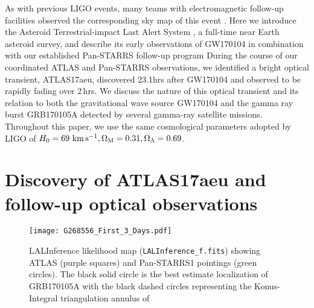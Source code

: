 \documentclass[twocolumn]{aastex61}
\newcommand{\kms}{\mbox{$\rm{\,km\,s^{-1}}$}}
\begin{document}
As with previous LIGO events, many teams with electromagnetic follow-up facilities observed the corresponding sky map of this event 
\citep[e.g. for a summary of the GW150914 effort see][]{2016ApJ...826L..13A}. 
Here we introduce the Asteroid Terrestrial-impact Last Alert System \citep[ATLAS;][]{2011PASP..123...58T}, a full-time near Earth asteroid survey,  
and describe its early observations of GW170104 in combination with 
our established Pan-STARRS follow-up program  \citep{2016arXiv161205560C,2016MNRAS.462.4094S,2016ApJ...827L..40S}
During the course of our coordinated ATLAS and Pan-STARRS observations, we identified a bright optical transient, ATLAS17aeu, discovered 23.1hrs after GW170104 and observed to be 
rapidly fading over 2\,hrs.  We discuss the nature of this optical transient and its relation to both the gravitational wave source
GW170104 and the gamma ray burst GRB170105A detected by several gamma-ray satellite missions. 
Throughout this paper, we use the same cosmological parameters adopted by LIGO of  
$H_0 = 69\,\kms,\Omega_{\rm M} = 0.31,\Omega_\Lambda =  0.69$. 

\section{Discovery of ATLAS17aeu and follow-up optical observations}
\label{sec:obs}

\begin{figure}
\texttt{[image: G268556\_First\_3\_Days.pdf]}
\caption{
{LALInference likelihood map (\texttt{LALInference\_f.fits})
showing ATLAS (purple squares) and Pan-STARRS1 pointings (green circles). The black solid circle is the best estimate localization of GRB170105A with the black dashed circles representing the Konus-Integral triangulation annulus of
\cite{GCN20406}}
}
\label{fig:skymap}
\end{figure}
\end{document}

